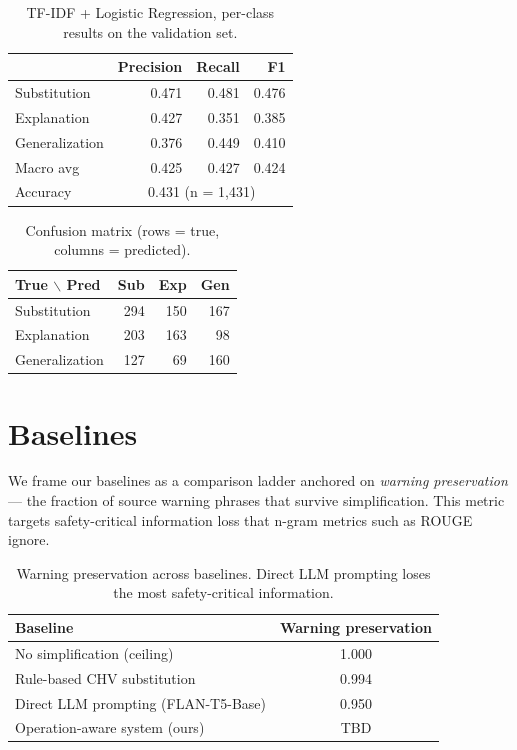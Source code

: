 \documentclass[11pt]{article}
\begin{document}
\begin{table}[h]
\centering
\begin{tabular}{lrrr}
\toprule
 & Precision & Recall & F1 \\
\midrule
Substitution   & 0.471 & 0.481 & 0.476 \\
Explanation    & 0.427 & 0.351 & 0.385 \\
Generalization & 0.376 & 0.449 & 0.410 \\
\midrule
Macro avg      & 0.425 & 0.427 & 0.424 \\
Accuracy       & \multicolumn{3}{c}{0.431 (n = 1{,}431)} \\
\bottomrule
\end{tabular}
\caption{TF-IDF + Logistic Regression, per-class results on the validation set.}
\label{tab:cls}
\end{table}

\begin{table}[h]
\centering
\begin{tabular}{lrrr}
\toprule
True $\backslash$ Pred & Sub & Exp & Gen \\
\midrule
Substitution   & 294 & 150 & 167 \\
Explanation    & 203 & 163 &  98 \\
Generalization & 127 &  69 & 160 \\
\bottomrule
\end{tabular}
\caption{Confusion matrix (rows = true, columns = predicted).}
\label{tab:cm}
\end{table}

\section{Baselines}

We frame our baselines as a comparison ladder anchored on \emph{warning
preservation} --- the fraction of source warning phrases that survive
simplification. This metric targets safety-critical information loss that
n-gram metrics such as ROUGE ignore.

\begin{table}[h]
\centering
\begin{tabular}{lc}
\toprule
Baseline & Warning preservation \\
\midrule
No simplification (ceiling)         & 1.000 \\
Rule-based CHV substitution         & 0.994 \\
Direct LLM prompting (FLAN-T5-Base) & 0.950 \\
Operation-aware system (ours)       & TBD \\
\bottomrule
\end{tabular}
\caption{Warning preservation across baselines. Direct LLM prompting loses the
most safety-critical information.}
\label{tab:baselines}
\end{table}
\end{document}
